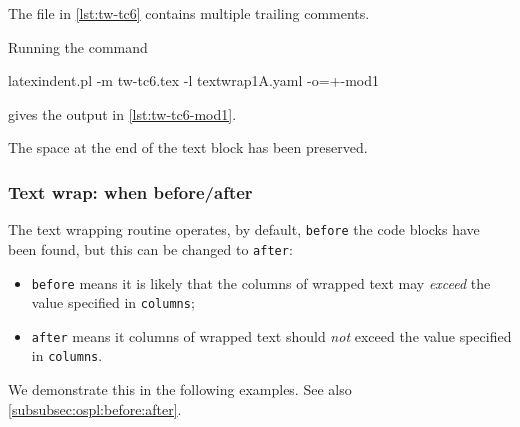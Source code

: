 \documentclass[10pt]{article}
\begin{document}
 \begin{example}
 The file in \cref{lst:tw-tc6} contains multiple trailing comments.

 Running the command

 \begin{commandshell}
latexindent.pl -m tw-tc6.tex -l textwrap1A.yaml -o=+-mod1 
\end{commandshell}

 gives the output in \cref{lst:tw-tc6-mod1}.
 \begin{cmhtcbraster}[raster column skip=.1\linewidth]
 \end{cmhtcbraster}
 The space at the end of the text block has been preserved.
 \end{example}

\subsubsection{Text wrap: when before/after}\label{subsubsec:tw:before:after}
 The text wrapping routine operates, by default, \texttt{before} the
  code blocks have been found, but
 this can be changed to \texttt{after}:
 \begin{itemize}
  \item \texttt{before} means it is likely that the columns of wrapped text may \emph{exceed} the
        value specified in \texttt{columns};
  \item \texttt{after} means it columns of wrapped text should \emph{not} exceed the value
        specified in \texttt{columns}.
 \end{itemize}
 We demonstrate this in the following examples. See also
 \cref{subsubsec:ospl:before:after}.
\end{document}
